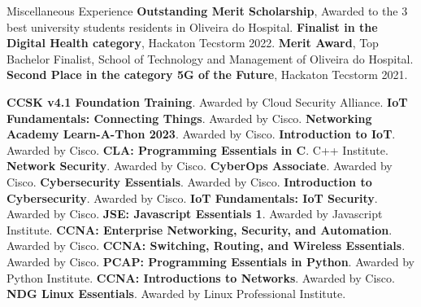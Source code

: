 \begin{rubric}{Miscellaneous Experience}
\entry*[2022] \textbf{Outstanding Merit Scholarship}, Awarded to the 3 best university students residents in Oliveira do Hospital.
%
\entry*[2022] \textbf{Finalist in the Digital Health category}, Hackaton Tecstorm 2022.
%
\entry*[2021] \textbf{Merit Award}, Top Bachelor Finalist, School of Technology and Management of Oliveira do Hospital.
%
\entry*[2021] \textbf{Second Place in the category 5G of the Future}, Hackaton Tecstorm 2021.

\entry*[2023] \textbf{CCSK v4.1 Foundation Training}. Awarded by Cloud Security Alliance.
\entry*[2023] \textbf{IoT Fundamentals: Connecting Things}. Awarded by Cisco.
\entry*[2023] \textbf{Networking Academy Learn-A-Thon 2023}. Awarded by Cisco.
\entry*[2023] \textbf{Introduction to IoT}. Awarded by Cisco.
\entry*[2022] \textbf{CLA: Programming Essentials in C}. C++ Institute.
\entry*[2022] \textbf{Network Security}. Awarded by Cisco.
\entry*[2021] \textbf{CyberOps Associate}. Awarded by Cisco.
\entry*[2021] \textbf{Cybersecurity Essentials}. Awarded by Cisco.
\entry*[2021] \textbf{Introduction to Cybersecurity}. Awarded by Cisco.
\entry*[2021] \textbf{IoT Fundamentals: IoT Security}. Awarded by Cisco.
\entry*[2021] \textbf{JSE: Javascript Essentials 1}. Awarded by Javascript Institute.
\entry*[2021] \textbf{CCNA: Enterprise Networking, Security, and Automation}. Awarded by Cisco.
\entry*[2021] \textbf{CCNA: Switching, Routing, and Wireless Essentials}. Awarded by Cisco.
\entry*[2021] \textbf{PCAP: Programming Essentials in Python}. Awarded by Python Institute.
\entry*[2020] \textbf{CCNA: Introductions to Networks}. Awarded by Cisco.
\entry*[2018] \textbf{NDG Linux Essentials}. Awarded by Linux Professional Institute.

\end{rubric}